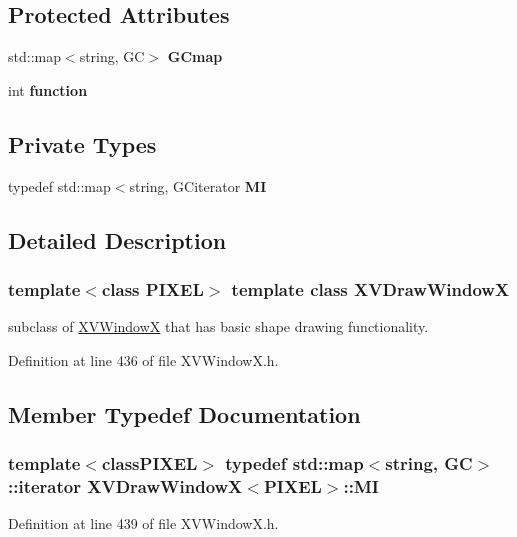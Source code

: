 \subsection*{Protected Attributes}
\begin{CompactItemize}
\item 
std::map$<$string, GC$>$ {\bf GCmap}
\item 
int {\bf function}
\end{CompactItemize}
\subsection*{Private Types}
\begin{CompactItemize}
\item 
typedef std::map$<$string, GCiterator {\bf MI}
\end{CompactItemize}


\subsection{Detailed Description}
\subsubsection*{template$<$class PIXEL$>$  template class XVDraw\-Window\-X}

subclass of \hyperlink{class_XVWindowX}{XVWindow\-X} that has basic shape drawing functionality.





Definition at line 436 of file XVWindow\-X.h.

\subsection{Member Typedef Documentation}
\label{XVDrawWindowX_u0}
\hypertarget{class_XVDrawWindowX_u0}{
\subsubsection[MI]{\setlength{\rightskip}{0pt plus 5cm}template$<$classPIXEL$>$ typedef std::map$<$string, GC$>$::iterator XVDraw\-Window\-X$<$PIXEL$>$::MI}}




Definition at line 439 of file XVWindow\-X.h.

